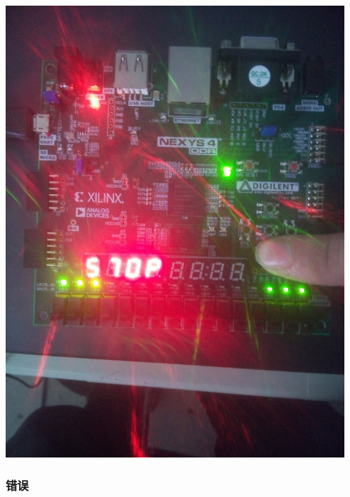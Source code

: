 \documentclass[11pt, a4paper]{article}
\begin{document}
\begin{CJK*}{UTF8}{gbsn}
\begin{appendices}
  \begin{center}
    \includegraphics[width = 5in]{stop2.jpg}
  \end{center}

  \subsubsection*{错误}


\end{appendices}
\end{CJK*}
\end{document}
